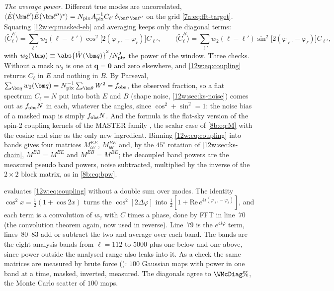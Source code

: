 \emph{The average power.} Different true modes are uncorrelated, $\langle\hat E(\bm\ell')\hat E(\bm\ell'')^*\rangle
=N_{\rm pix}A_{\rm pix}^{-1}C_{\ell'}\,\delta_{\bm\ell'\bm\ell''}$ on the grid \eqref{7a:eq:fft-target}. Squaring
\eqref{12w:eq:masked-eb} and averaging keeps only the diagonal terms:
\begin{equation}
\langle\tilde C^E_\ell\rangle=\sum_{\bm\ell'}w_2(\bm\ell-\bm\ell')\cos^2\bigl[2(\varphi_{\ell'}-\varphi_\ell)\bigr]C_{\ell'},
\qquad
\langle\tilde C^B_\ell\rangle=\sum_{\bm\ell'}w_2(\bm\ell-\bm\ell')\sin^2\bigl[2(\varphi_{\ell'}-\varphi_\ell)\bigr]C_{\ell'},
\label{12w:eq:coupling}
\end{equation}
with $w_2(\bm q)\equiv\abs{\hat W(\bm q)}^2/N_{\rm pix}^2$ the power of the window. Three checks. Without a mask
$w_2$ is one at $\bm q=\bm0$ and zero elsewhere, and \eqref{12w:eq:coupling} returns $C_\ell$ in $E$ and nothing in
$B$. By Parseval, $\sum_{\bm q}w_2(\bm q)=N_{\rm pix}^{-1}\sum_{\bm\theta}W^2=f_{\rm obs}$, the observed fraction,
so a flat spectrum $C_\ell=N$ put into both $E$ and $B$ (shape noise, \cref{12w:sec:ks-noise}) comes out as
$f_{\rm obs}N$ in each, whatever the angles, since $\cos^2+\sin^2=1$: the noise bias of a masked map is simply
$f_{\rm obs}N$. And the formula is the flat-sky version of the spin-2 coupling kernels of the MASTER family
\cite{Hivon2002}, the scalar case of \cref{8b:eq:M} with the cosine and sine as the only new ingredient. Binning
\eqref{12w:eq:coupling} into bands gives four matrices $M^{EE}_{bb'}$, $M^{BE}_{bb'}$ and, by the $45^\circ$
rotation of \cref{12w:sec:ks-chain}, $M^{BB}=M^{EE}$ and $M^{EB}=M^{BE}$; the decoupled band powers are the measured
pseudo band powers, noise subtracted, multiplied by the inverse of the $2\times2$ block matrix, as in
\eqref{8b:eq:bpw}.


 evaluates \eqref{12w:eq:coupling} without a double sum over modes. The identity
$\cos^2x=\frac12(1+\cos2x)$ turns the $\cos^2[2\Delta\varphi]$ into $\frac12[1+\mathrm{Re}\,e^{4i(\varphi_{\ell'}-
\varphi_\ell)}]$, and each term is a convolution of $w_2$ with $C$ times a phase, done by FFT in line~70 (the
convolution theorem again, now used in reverse). Line~79 is the $e^{4i\varphi}$ term, lines~80--83 add or subtract the
two and average over each band. The bands are the eight analysis bands from $\ell=112$ to $5000$ plus one below
and one above, since power outside the analysed range also leaks into it. As a check the same matrices are measured
by brute force (): $100$ Gaussian maps with power in one band at a time, masked, inverted, measured.
The diagonals agree to $\WMcDiag\%$, the Monte Carlo scatter of $100$ maps.

